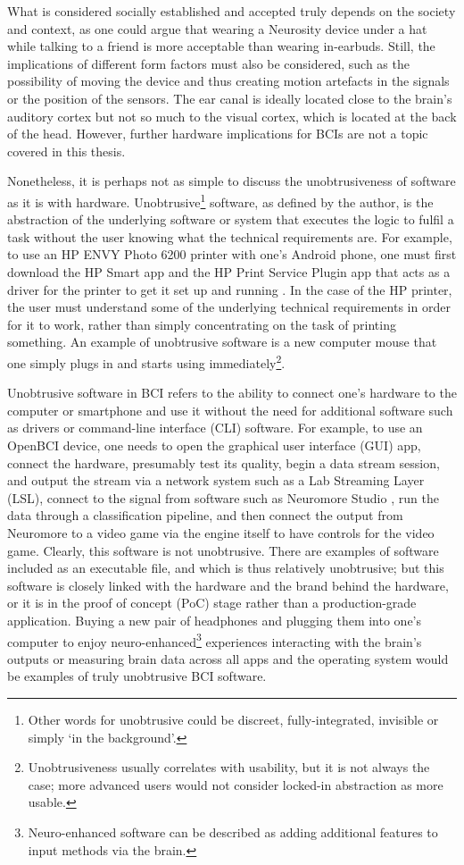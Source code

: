What is considered socially established and accepted truly depends on the society and context, as one could argue that wearing a Neurosity device under a hat while talking to a friend is more acceptable than wearing in-earbuds. Still, the implications of different form factors must also be considered, such as the possibility of moving the device and thus creating motion artefacts in the signals or the position of the sensors. The ear canal is ideally located close to the brain’s auditory cortex but not so much to the visual cortex, which is located at the back of the head. However, further hardware implications for BCIs are not a topic covered in this thesis.

Nonetheless, it is perhaps not as simple to discuss the unobtrusiveness of software as it is with hardware. Unobtrusive\footnote{Other words for unobtrusive could be discreet, fully-integrated, invisible or simply ‘in the background’.} software, as defined by the author, is the abstraction of the underlying software or system that executes the logic to fulfil a task without the user knowing what the technical requirements are. For example, to use an HP ENVY Photo 6200 printer with one’s Android phone, one must first download the HP Smart app and the HP Print Service Plugin app that acts as a driver for the printer to get it set up and running \citep{hp_hp_nodate}. In the case of the HP printer, the user must understand some of the underlying technical requirements in order for it to work, rather than simply concentrating on the task of printing something. An example of unobtrusive software is a new computer mouse that one simply plugs in and starts using immediately\footnote{Unobtrusiveness usually correlates with usability, but it is not always the case; more advanced users would not consider locked-in abstraction as more usable.}.

Unobtrusive software in BCI refers to the ability to connect one’s hardware to the computer or smartphone and use it without the need for additional software such as drivers or command-line interface (CLI) software. For example, to use an OpenBCI device, one needs to open the graphical user interface (GUI) app, connect the hardware, presumably test its quality, begin a data stream session, and output the stream via a network system such as a Lab Streaming Layer (LSL), connect to the signal from software such as Neuromore Studio \citep{openbci_neuromore_nodate}, run the data through a classification pipeline, and then connect the output from Neuromore to a video game via the engine itself to have controls for the video game. Clearly, this software is not unobtrusive. There are examples of software included as an executable file, and which is thus relatively unobtrusive; but this software is closely linked with the hardware and the brand behind the hardware, or it is in the proof of concept (PoC) stage rather than a production-grade application. Buying a new pair of headphones and plugging them into one’s computer to enjoy neuro-enhanced\footnote{Neuro-enhanced software can be described as adding additional features to input methods via the brain.} experiences interacting with the brain’s outputs or measuring brain data across all apps and the operating system would be examples of truly unobtrusive BCI software.

